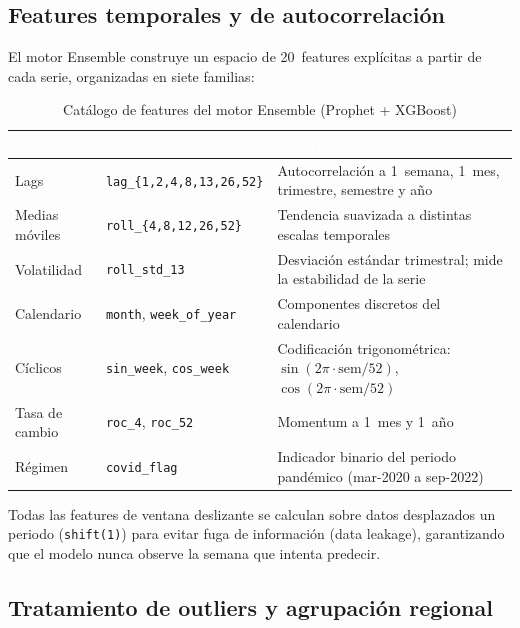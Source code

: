 \documentclass[12pt, letterpaper]{article}
\begin{document}
\subsection{Features temporales y de autocorrelación}

El motor Ensemble construye un espacio de 20~features explícitas a partir de cada serie, organizadas en siete familias:

\begin{table}[H]
\centering
\caption{Catálogo de features del motor Ensemble (Prophet + XGBoost)}
\label{tab:features_catalogo}
\small
\renewcommand{\arraystretch}{1.15}
\begin{tabularx}{\textwidth}{l l >{\raggedright\arraybackslash}X}
\toprule
\rowcolor{teal!90} \textcolor{white}{\textbf{Familia}} & \textcolor{white}{\textbf{Features}} & \textcolor{white}{\textbf{Descripción}} \\
\midrule
Lags & \texttt{lag\_\{1,2,4,8,13,26,52\}} & Autocorrelación a 1~semana, 1~mes, trimestre, semestre y año \\
\rowcolor{lightgreen} Medias móviles & \texttt{roll\_\{4,8,12,26,52\}} & Tendencia suavizada a distintas escalas temporales \\
Volatilidad & \texttt{roll\_std\_13} & Desviación estándar trimestral; mide la estabilidad de la serie \\
\rowcolor{lightgreen} Calendario & \texttt{month}, \texttt{week\_of\_year} & Componentes discretos del calendario \\
Cíclicos & \texttt{sin\_week}, \texttt{cos\_week} & Codificación trigonométrica: $\sin(2\pi \cdot \text{sem}/52)$, $\cos(2\pi \cdot \text{sem}/52)$ \\
\rowcolor{lightgreen} Tasa de cambio & \texttt{roc\_4}, \texttt{roc\_52} & Momentum a 1~mes y 1~año \\
Régimen & \texttt{covid\_flag} & Indicador binario del periodo pandémico (mar-2020 a sep-2022) \\
\bottomrule
\end{tabularx}
\end{table}

Todas las features de ventana deslizante se calculan sobre datos desplazados un periodo (\texttt{shift(1)}) para evitar fuga de información (data leakage), garantizando que el modelo nunca observe la semana que intenta predecir.

\subsection{Tratamiento de outliers y agrupación regional}
\end{document}
